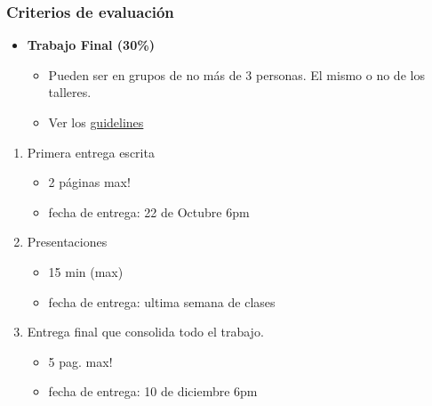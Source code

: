 \documentclass[
  shownotes,
  xcolor={svgnames},
  hyperref={colorlinks,citecolor=DarkBlue,linkcolor=DarkRed,urlcolor=DarkBlue}
  , aspectratio=169]{beamer}
\begin{document}
\begin{frame}
\frametitle{Criterios de evaluación}
\begin{itemize}

  \item {\bf Trabajo Final  (30\%)}
  \begin{itemize}
  \item Pueden ser en grupos de no más de 3 personas. El mismo o no de los talleres.
  \item Ver los \href{https://github.com/ECON-4676-UNIANDES-Fall-2021/Problem_Sets/tree/master/Final_Project}{guidelines}
  \end{itemize}
  \end{itemize}
     \medskip
  \begin{enumerate}
      
      \item Primera entrega escrita 
      \begin{itemize}
        \item 2 páginas max!
        \item fecha de entrega: 22 de Octubre 6pm
      \end{itemize}
  
     \medskip
  \item  Presentaciones
      \begin{itemize}
        \item 15 min (max)
        \item fecha de entrega: ultima semana de clases
      \end{itemize}
      \medskip
    \item  Entrega final que consolida todo el trabajo.
      \begin{itemize}
        \item 5 pag. max!
        \item fecha de entrega:  10 de diciembre 6pm
      \end{itemize}
\end{enumerate}






\end{frame}
\end{document}
